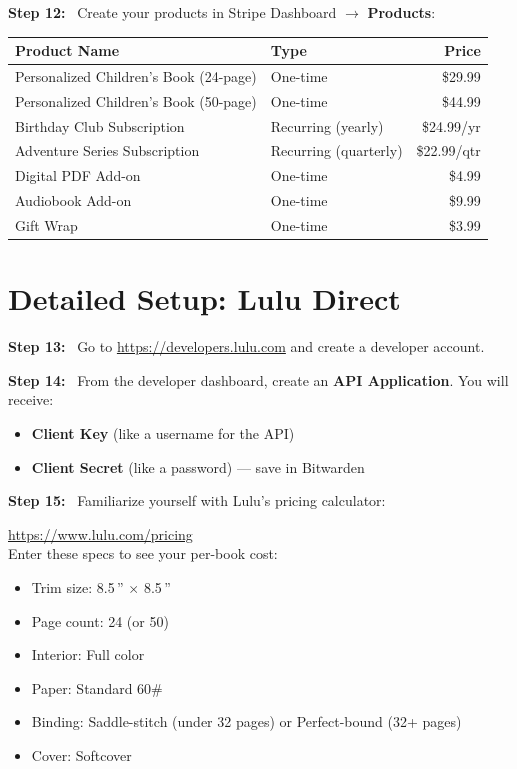 \documentclass[12pt, letterpaper, oneside]{book}
\newcommand{\step}[1]{\noindent\textbf{\textcolor{primary}{Step #1:}}~}
\begin{document}
\step{12} Create your products in Stripe Dashboard $\rightarrow$ \textbf{Products}:
\begin{table}[H]
\centering
\begin{tabularx}{\textwidth}{Xlr}
\toprule
\textbf{Product Name} & \textbf{Type} & \textbf{Price} \\
\midrule
Personalized Children's Book (24-page) & One-time & \$29.99 \\
Personalized Children's Book (50-page) & One-time & \$44.99 \\
Birthday Club Subscription & Recurring (yearly) & \$24.99/yr \\
Adventure Series Subscription & Recurring (quarterly) & \$22.99/qtr \\
Digital PDF Add-on & One-time & \$4.99 \\
Audiobook Add-on & One-time & \$9.99 \\
Gift Wrap & One-time & \$3.99 \\
\bottomrule
\end{tabularx}
\end{table}

\section{Detailed Setup: Lulu Direct}

\step{13} Go to \url{https://developers.lulu.com} and create a developer account.

\step{14} From the developer dashboard, create an \textbf{API Application}. You will receive:
\begin{itemize}[leftmargin=2em]
  \item \textbf{Client Key} (like a username for the API)
  \item \textbf{Client Secret} (like a password) --- save in Bitwarden
\end{itemize}

\step{15} Familiarize yourself with Lulu's pricing calculator:
\begin{actionbox}
\url{https://www.lulu.com/pricing}\\[4pt]
Enter these specs to see your per-book cost:
\begin{itemize}[leftmargin=1.5em]
  \item Trim size: 8.5\,'' $\times$ 8.5\,''
  \item Page count: 24 (or 50)
  \item Interior: Full color
  \item Paper: Standard 60\#
  \item Binding: Saddle-stitch (under 32 pages) or Perfect-bound (32+ pages)
  \item Cover: Softcover
\end{itemize}
\end{actionbox}
\end{document}
